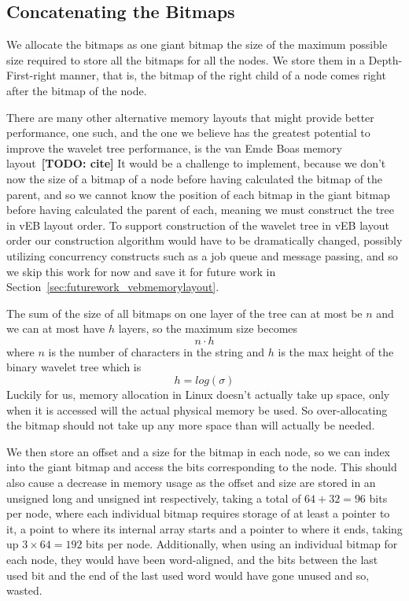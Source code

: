 \subsection{Concatenating the Bitmaps}
We allocate the bitmaps as one giant bitmap the size of the maximum possible size required to store all the bitmaps for all the nodes.
We store them in a Depth-First-right manner, that is, the bitmap of the right child of a node comes right after the bitmap of the node.

There are many other alternative memory layouts that might provide better performance, one such, and the one we believe has the greatest potential to improve the wavelet tree performance, is the van Emde Boas memory layout~\textbf{[TODO: cite]}
It would be a challenge to implement, because we don't now the size of a bitmap of a node before having calculated the bitmap of the parent, and so we cannot know the position of each bitmap in the giant bitmap before having calculated the parent of each, meaning we must construct the tree in vEB layout order.
To support construction of the wavelet tree in vEB layout order our construction algorithm would have to be dramatically changed, possibly utilizing concurrency constructs such as a job queue and message passing, and so we skip this work for now and save it for future work in Section~\ref{sec:futurework_vebmemorylayout}.

The sum of the size of all bitmaps on one layer of the tree can at most be $n$ and we can at most have $h$ layers, so the maximum size becomes
\[n \cdot h\]
where $n$ is the number of characters in the string and $h$ is the max height of the binary wavelet tree which is
\[ h = log(\sigma) \]
Luckily for us, memory allocation in Linux doesn't actually take up space, only when it is accessed will the actual physical memory be used.
So over-allocating the bitmap should not take up any more space than will actually be needed.

We then store an offset and a size for the bitmap in each node, so we can index into the giant bitmap and access the bits corresponding to the node.
This should also cause a decrease in memory usage as the offset and size are stored in an unsigned long and unsigned int respectively, taking a total of $64+32=96$ bits per node, where each individual bitmap requires storage of at least a pointer to it, a point to where its internal array starts and a pointer to where it ends, taking up $3 \times 64=192$ bits per node.
Additionally, when using an individual bitmap for each node, they would have been word-aligned, and the bits between the last used bit and the end of the last used word would have gone unused and so, wasted.

